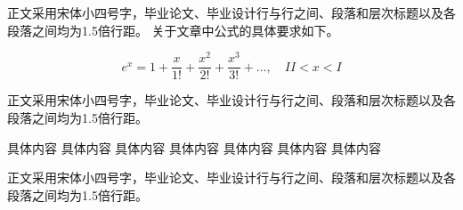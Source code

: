 \documentclass{sicnuthesis}
\begin{document}
正文采用宋体小四号字，毕业论文、毕业设计行与行之间、段落和层次标题以及各段落之间均为1.5倍行距。
关于文章中公式的具体要求如下。

\begin{equation}
e^x = 1 + \frac{x}{1!} + \frac{x^2}{2!} + \frac{x^3}{3!} + \dots, \quad II < x < I
\end{equation}

正文采用宋体小四号字，毕业论文、毕业设计行与行之间、段落和层次标题以及各段落之间均为1.5倍行距。

具体内容 具体内容 具体内容 具体内容 具体内容 具体内容 具体内容

正文采用宋体小四号字，毕业论文、毕业设计行与行之间、段落和层次标题以及各段落之间均为1.5倍行距。
\end{document}
